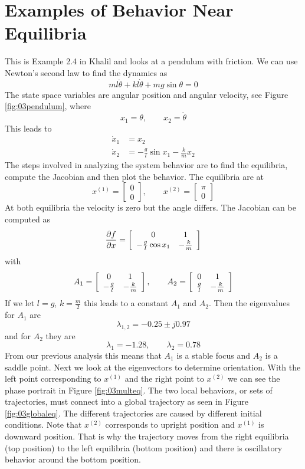 \section{Examples of Behavior Near Equilibria}
\begin{example}
\label{ex:03pendulum}
This is Example 2.4 in Khalil and looks at a pendulum with friction. We can use Newton's second law to find the dynamics as
$$ml\ddot{\theta} + kl\dot{\theta} + mg\sin\theta = 0$$
The state space variables are angular position and angular velocity, see Figure \ref{fig:03pendulum}, where
$$ x_1 = \theta, \qquad x_2 = \dot{\theta}$$
This leads to
\begin{align*}
\dot{x}_1 &= x_2 \\
\dot{x}_2 &= -\tfrac{g}{l}\sin x_1 - \tfrac{k}{m}x_2
\end{align*}
The steps involved in analyzing the system behavior are to find the equilibria, compute the Jacobian and then plot the behavior. The equilibria are at
$$x^{(1)} = \left[\begin{array}{c} 0 \\ 0 \end{array}\right], \qquad x^{(2)} = \left[\begin{array}{c} \pi \\ 0 \end{array}\right]$$
At both equilibria the velocity is zero but the angle differs. The Jacobian can be computed as
$$\frac{\partial f}{\partial x} = \left[\begin{array}{c c} 0 & 1 \\ -\tfrac{g}{l}\cos x_1 & -\tfrac{k}{m} \end{array}\right]$$
with
$$A_1 = \left[\begin{array}{c c} 0 & 1 \\ -\tfrac{g}{l} & -\tfrac{k}{m} \end{array}\right], \qquad A_2 = \left[\begin{array}{c c} 0 & 1 \\ \tfrac{g}{l} & -\tfrac{k}{m} \end{array}\right]$$
If we let $l=g$, $k=\tfrac{m}{2}$ this leads to a constant $A_1$ and $A_2$. Then the eigenvalues for $A_1$ are
$$\lambda_{1,2} = -0.25\pm j0.97$$
and for $A_2$ they are
$$\lambda_1 = -1.28, \qquad \lambda_2 = 0.78$$
From our previous analysis this means that $A_1$ is a stable focus and $A_2$ is a saddle point. Next we look at the eigenvectors to determine orientation. With the left point corresponding to $x^{(1)}$ and the right point to $x^{(2)}$ we can see the phase portrait in Figure \ref{fig:03multeq}. The two local behaviors, or sets of trajectories, must connect into a global trajectory as seen in Figure \ref{fig:03globaleq}. The different trajectories are caused by different initial conditions. Note that $x^{(2)}$ corresponds to upright position and $x^{(1)}$ is downward position. That is why the trajectory moves from the right equilibria (top position) to the left equilibria (bottom position) and there is oscillatory behavior around the bottom position.


\end{example}
